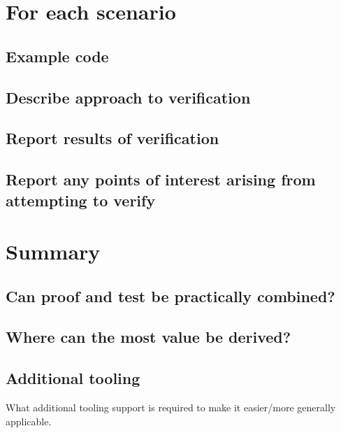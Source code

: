\documentclass{article}
\begin{document}
\section{For each scenario}
\subsection{Example code}
\subsection{Describe approach to verification}
\subsection{Report results of verification}
\subsection{Report any points of interest arising from attempting to verify}

\section{Summary}

\subsection{Can proof and test be practically combined?}

\subsection{Where can the most value be derived?}

\subsection{Additional tooling}
What additional tooling support is required to make it easier/more
generally applicable.




\end{document}

